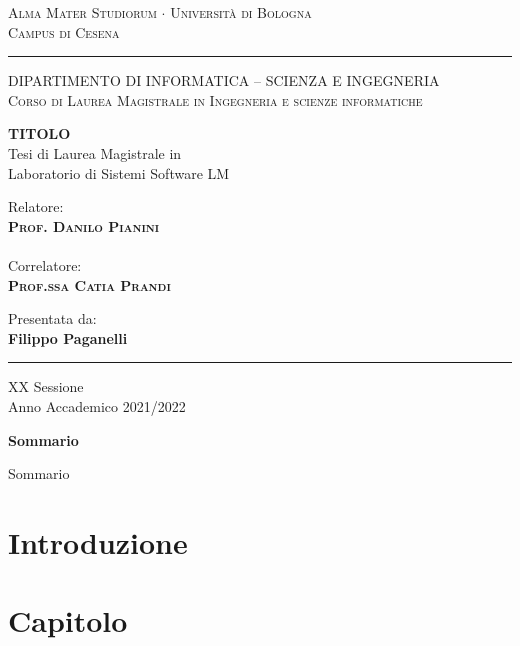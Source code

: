 \documentclass[12pt,a4paper]{report}
\begin{document}
  
\lstset{language=C, numbers = left}
\begin{titlepage}
\begin{center}
{{\Large{\textsc{Alma Mater Studiorum $\cdot$ Universit\`a di
Bologna\\\vspace{2mm}Campus di Cesena}}}} \rule[0.1cm]{15.8cm}{0.2mm}

{\small{\textsc { DIPARTIMENTO DI INFORMATICA – SCIENZA E INGEGNERIA \\
\vspace{3mm}
Corso di Laurea Magistrale in Ingegneria e scienze informatiche}}}
\end{center}
\vspace{15mm}
\begin{center}
{\LARGE\textbf{TITOLO}}\\
\vspace{20mm} {\large{\sc Tesi di Laurea Magistrale in\\ Laboratorio di Sistemi Software LM}}
\end{center}
\vfill
\par
\noindent

\begin{minipage}[t]{0.47\textwidth}
{\large{\sc Relatore:}\\
{\bf \textsc{Prof. Danilo Pianini}}}\\ \\
{\large{\sc Correlatore:}\\
{\bf \textsc{Prof.ssa Catia Prandi}}}\\
\vskip 8pt
\end{minipage}
\hfill
\begin{minipage}[t]{0.47\textwidth}\raggedleft
{\large{\sc Presentata da:}\\
{\bf Filippo Paganelli}}
\end{minipage}
\vspace{20mm}
\begin{center}
\rule[0.1cm]{15.8cm}{0.2mm}
{\large{\sc XX Sessione\\
Anno Accademico 2021/2022}}
\end{center}
\end{titlepage}

\newpage

\begin{center}
{\LARGE{\bf Sommario}}
\end{center}
{
\noindent
Sommario
}

\newpage

\tableofcontents

\chapter{Introduzione}
\label{ch:introduzione}


\chapter{Capitolo}
\label{ch:capitolo}

\end{document}
